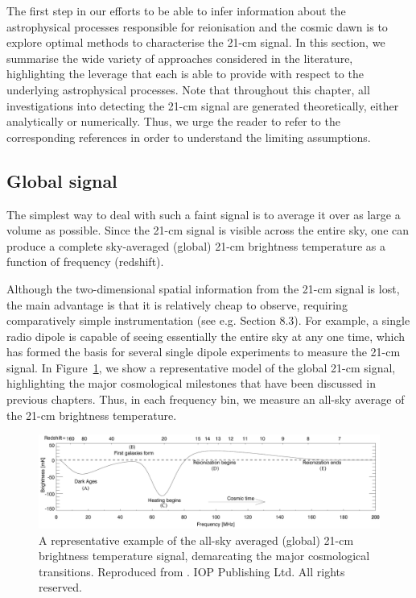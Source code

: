 The first step in our efforts to be able to infer information about the astrophysical processes responsible for reionisation and the cosmic dawn is to explore optimal methods to characterise the 21-cm signal. In this section, we summarise the wide variety of approaches considered in the literature, highlighting the leverage that each is able to provide with respect to the underlying astrophysical processes. Note that throughout this chapter, all investigations into detecting the 21-cm signal are generated theoretically, either analytically or numerically. Thus, we urge the reader to refer to the corresponding references in order to understand the limiting assumptions.

\subsection{Global signal} \label{sec:global}

The simplest way to deal with such a faint signal is to average it over as large a volume as possible. Since the 21-cm signal is visible across the entire sky, one can produce a complete sky-averaged (global) 21-cm brightness temperature as a function of frequency (redshift). 

Although the two-dimensional spatial information from the 21-cm signal is lost, the main advantage is that it is relatively cheap to observe, requiring comparatively simple instrumentation (see e.g. Section 8.3). For example, a single radio dipole is capable of seeing essentially the entire sky at any one time, which has formed the basis for several single dipole experiments to measure the 21-cm signal. In Figure~\ref{fig:global}, we show a representative model of the global 21-cm signal, highlighting the major cosmological milestones that have been discussed in previous chapters. Thus, in each frequency bin, we measure an all-sky average of the 21-cm brightness temperature.

\begin{figure}[]
\begin{center}
\includegraphics[trim = 0.2cm 0.6cm 0.2cm 0.2cm, scale = 0.45]{Greig/GlobalSignal}
\end{center}
\caption{A representative example of the all-sky averaged (global) 21-cm brightness temperature signal, demarcating the major cosmological transitions. Reproduced from \cite{Pritchard:2012}. \textcopyright IOP Publishing Ltd. All rights reserved.}
\label{fig:global}
\end{figure}

